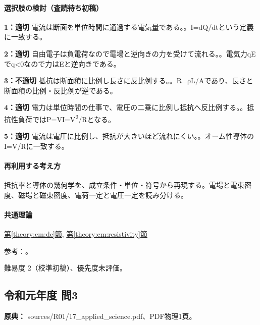 \paragraph{選択肢の検討（査読待ち初稿）}\mbox{}\par

\noindent\textbf{1：適切} 電流は断面を単位時間に通過する電気量である。。I=\allowbreak{}dQ/dtという定義に一致する。\par

\noindent\textbf{2：適切} 自由電子は負電荷なので電場と逆向きの力を受けて流れる。。電気力qEでq<0なので力はEと逆向きである。\par

\noindent\textbf{3：不適切} 抵抗は断面積に比例し長さに反比例する。。R=ρL/Aであり、長さと断面積の比例・反比例が逆である。\par

\noindent\textbf{4：適切} 電力は単位時間の仕事で、電圧の二乗に比例し抵抗へ反比例する。。抵抗性負荷ではP=\allowbreak{}VI=\allowbreak{}V\textsuperscript{2}/Rとなる。\par

\noindent\textbf{5：適切} 電流は電圧に比例し、抵抗が大きいほど流れにくい。。オーム性導体のI=\allowbreak{}V/Rに一致する。\par

\paragraph{再利用する考え方} 抵抗率と導体の幾何学を、成立条件・単位・符号から再現する。電場と電束密度、磁場と磁束密度、電荷一定と電圧一定を読み分ける。

\paragraph{共通理論} \hyperref[theory:em:dc]{第\ref*{theory:em:dc}節}, \hyperref[theory:em:resistivity]{第\ref*{theory:em:resistivity}節}

\par 参考：\cite{mit_em06}。

\par 難易度 2（校準初稿）、優先度未評価。

\subsection{令和元年度 問3}
\label{q:r01-reg-applied-03}

\noindent\textbf{原典：} sources/R01/17\_applied\_science.pdf、PDF物理1頁。

